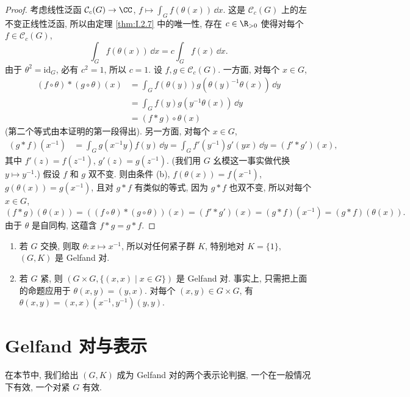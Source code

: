 \begin{proof}
考虑线性泛函 $\mathcal{C}_c(G) \to \CC$, $f \longmapsto \int_G f(\theta(x))\,\dd x$. 这是 $\mathcal{C}_c(G)$ 上的左不变正线性泛函, 所以由定理 \ref{thm:I.2.7} 中的唯一性, 存在 $c \in \R_{>0}$ 使得对每个 $f \in \mathcal{C}_c(G)$,
\[
\int_G f(\theta(x))\,\dd x = c\int_G f(x)\,\dd x.
\]
由于 $\theta^2 = \mathrm{id}_G$, 必有 $c^2 = 1$, 所以 $c = 1$.
设 $f, g \in \mathcal{C}_c(G)$. 一方面, 对每个 $x \in G$,
\begin{align*}
(f \circ \theta) * (g \circ \theta)(x) &= \int_G f(\theta(y))g(\theta(y)^{-1}\theta(x))\,\dd y \\
&= \int_G f(y)g(y^{-1}\theta(x))\,\dd y \\
&= (f * g) \circ \theta(x)
\end{align*}
(第二个等式由本证明的第一段得出). 另一方面, 对每个 $x \in G$,
\begin{align*}
(g * f)(x^{-1}) &= \int_G g(x^{-1}y)f(y)\,\dd y = \int_G f'(y^{-1})g'(yx)\,\dd y = (f' * g')(x),
\end{align*}
其中 $f'(z) = f(z^{-1})$, $g'(z) = g(z^{-1})$. (我们用 $G$ 幺模这一事实做代换 $y \longmapsto y^{-1}$.)
假设 $f$ 和 $g$ 双不变. 则由条件 (b), $f(\theta(x)) = f(x^{-1})$, $g(\theta(x)) = g(x^{-1})$, 且对 $g * f$ 有类似的等式, 因为 $g * f$ 也双不变, 所以对每个 $x \in G$,
\[
(f * g)(\theta(x)) = ((f \circ \theta) * (g \circ \theta))(x) = (f' * g')(x) = (g * f)(x^{-1}) = (g * f)(\theta(x)).
\]
由于 $\theta$ 是自同构, 这蕴含 $f * g = g * f$.
\end{proof}

\begin{example}[对合判据的应用]
\label{exa:V.2.6}
\begin{enumerate}
\item[(1)] 若 $G$ 交换, 则取 $\theta \colon x \longmapsto x^{-1}$, 所以对任何紧子群 $K$, 特别地对 $K = \{1\}$, $(G, K)$ 是 Gelfand 对.
\item[(2)] 若 $G$ 紧, 则 $(G \times G, \{(x, x) \mid x \in G\})$ 是 Gelfand 对. 事实上, 只需把上面的命题应用于 $\theta(x, y) = (y, x)$. 对每个 $(x, y) \in G \times G$, 有 $\theta(x, y) = (x, x)(x^{-1}, y^{-1})(y, y)$.
\end{enumerate}
\end{example}

\section{Gelfand 对与表示}
在本节中, 我们给出 $(G, K)$ 成为 Gelfand 对的两个表示论判据, 一个在一般情况下有效, 一个对紧 $G$ 有效.

